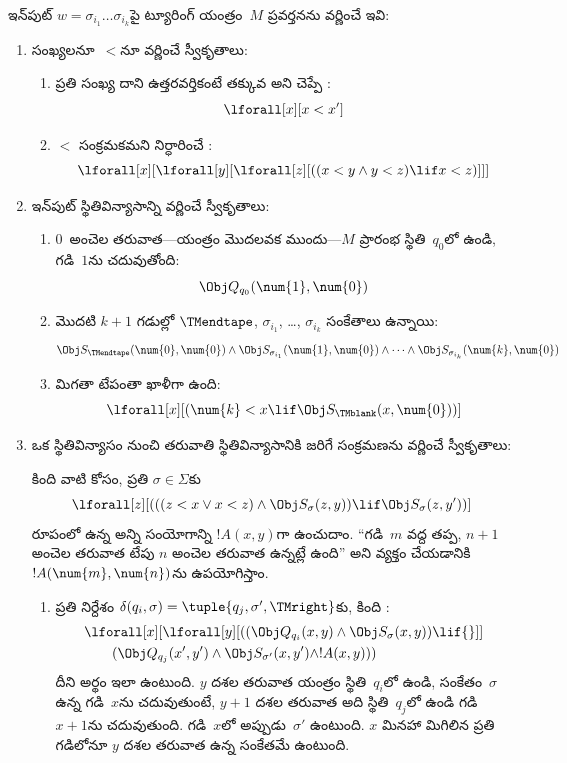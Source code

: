 \documentclass[../../../include/open-logic-section]{subfiles}
\begin{document}
ఇన్‌పుట్ $w = \sigma_{i_1}\dots\sigma_{i_k}$పై ట్యూరింగ్ యంత్రం~$M$
ప్రవర్తనను వర్ణించే  ఇవి:
\begin{enumerate}
\item సంఖ్యలనూ~$<$నూ వర్ణించే స్వీకృతాలు:
\begin{enumerate}
\item ప్రతి సంఖ్య దాని ఉత్తరవర్తికంటే తక్కువ అని చెప్పే :
\[
\lforall[x][x < x']
\]
\item $<$ సంక్రమకమని నిర్ధారించే :
\[
\lforall[x][\lforall[y][\lforall[z][
      ((x < y \land y < z) \lif x < z)]]]
\]
\end{enumerate}
\item ఇన్‌పుట్ స్థితివిన్యాసాన్ని వర్ణించే స్వీకృతాలు:
\begin{enumerate}
\item $0$~అంచెల తరువాత---యంత్రం మొదలవక ముందు---$M$ ప్రారంభ స్థితి~$q_0$లో
  ఉండి, గడి~$1$ను చదువుతోంది:
\[
\Obj Q_{q_0}(\num{1}, \num{0})
\]
\item మొదటి $k+1$ గడుల్లో $\TMendtape$, $\sigma_{i_1}$, \dots,
  $\sigma_{i_k}$ సంకేతాలు ఉన్నాయి:
\[
\Obj S_\TMendtape(\num{0}, \num{0}) \land
\Obj S_{\sigma_{i_1}}(\num{1}, \num{0}) \land
\dots \land
\Obj S_{\sigma_{i_k}}(\num{k}, \num{0})
\]
\item మిగతా టేపంతా ఖాళీగా ఉంది:
\[
\lforall[x][(\num{k} < x \lif \Obj S_\TMblank(x, \num{0}))]
\]
\end{enumerate}
\item ఒక స్థితివిన్యాసం నుంచి తరువాతి స్థితివిన్యాసానికి జరిగే సంక్రమణను వర్ణించే స్వీకృతాలు:

కింది వాటి కోసం, ప్రతి $\sigma \in \Sigma$కు
\[
\lforall[z][
  (((z < x \lor x < z) \land \Obj S_\sigma(z, y))
  \lif \Obj S_\sigma(z, y'))]
\]
రూపంలో ఉన్న అన్ని  సంయోగాన్ని $!A(x, y)$గా ఉంచుదాం.
``గడి~$m$ వద్ద తప్ప, $n+1$ అంచెల తరువాత టేపు $n$ అంచెల తరువాత ఉన్నట్లే
ఉంది'' అని వ్యక్తం చేయడానికి $!A(\num{m},\num{n})$ను ఉపయోగిస్తాం.
\begin{enumerate}
\item {} ప్రతి నిర్దేశం $\delta(q_i, \sigma) =
  \tuple{q_j, \sigma', \TMright}$కు, కింది :
\begin{align*}
& \lforall[x][\lforall[y][(
   (\Obj Q_{q_i}(x, y) \land \Obj S_{\sigma}(x, y)) \lif {}]] \\
&\qquad   (\Obj Q_{q_j}(x', y') \land \Obj S_{\sigma'}(x, y') \land
!A(x, y)))
\end{align*}
దీని అర్థం ఇలా ఉంటుంది. $y$ దశల తరువాత యంత్రం స్థితి~$q_i$లో ఉండి,
సంకేతం~$\sigma$ ఉన్న గడి~$x$ను చదువుతుంటే, $y+1$ దశల తరువాత అది
స్థితి~$q_j$లో ఉండి గడి~$x+1$ను చదువుతుంది. గడి~$x$లో అప్పుడు~$\sigma'$
ఉంటుంది. $x$ మినహా మిగిలిన ప్రతి గడిలోనూ $y$ దశల తరువాత ఉన్న సంకేతమే ఉంటుంది.


\end{enumerate}
\end{enumerate}
\end{document}

